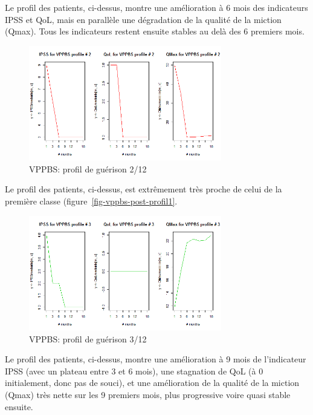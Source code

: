 Le profil des patients, ci-dessus, montre une amélioration à 6 mois des indicateurs IPSS et QoL, mais en parallèle une dégradation de la qualité de la miction (Qmax). Tous les indicateurs restent ensuite stables au delà des 6 premiers mois.

\begin{figure}[H]
\centering
\includegraphics[width=0.75\textwidth]{../Fig/VPPBS/vppbs-profil-post-02.png}
\caption[]{VPPBS: profil de guérison 2/12}
\label{fig-vppbs-post-profil2}
\end{figure}

Le profil des patients, ci-dessus, est extrêmement très proche de celui de la première classe (figure~\ref{fig-vppbs-post-profil1}.

\begin{figure}[H]
\centering
\includegraphics[width=0.75\textwidth]{../Fig/VPPBS/vppbs-profil-post-03.png}
\caption[]{VPPBS: profil de guérison 3/12}
\label{fig-vppbs-post-profil3}
\end{figure}

Le profil des patients, ci-dessus, montre une amélioration à 9 mois de l'indicateur IPSS (avec un plateau entre 3 et 6 mois), une stagnation de QoL (à 0 initialement, donc pas de souci), et une amélioration de la qualité de la miction (Qmax) très nette sur les 9 premiers mois, plus progressive voire quasi stable ensuite.

